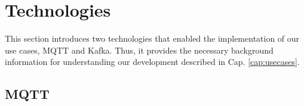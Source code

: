 \section{Technologies}
This section introduces two technologies that enabled the implementation of our use cases, MQTT and Kafka. Thus, it provides the necessary background information for understanding our development described in Cap. \ref{cap:usecases}.

\subsection{MQTT}